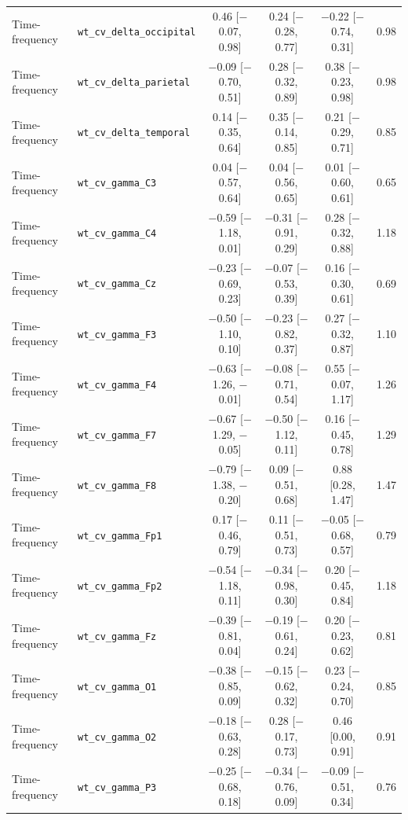 {\begin{longtable}{llcccc}
Time-frequency & \texttt{wt\_cv\_delta\_occipital} & 0.46 [$-$0.07, 0.98] & 0.24 [$-$0.28, 0.77] & $-$0.22 [$-$0.74, 0.31] & 0.98 \\
Time-frequency & \texttt{wt\_cv\_delta\_parietal} & $-$0.09 [$-$0.70, 0.51] & 0.28 [$-$0.32, 0.89] & 0.38 [$-$0.23, 0.98] & 0.98 \\
Time-frequency & \texttt{wt\_cv\_delta\_temporal} & 0.14 [$-$0.35, 0.64] & 0.35 [$-$0.14, 0.85] & 0.21 [$-$0.29, 0.71] & 0.85 \\
Time-frequency & \texttt{wt\_cv\_gamma\_C3} & 0.04 [$-$0.57, 0.64] & 0.04 [$-$0.56, 0.65] & 0.01 [$-$0.60, 0.61] & 0.65 \\
Time-frequency & \texttt{wt\_cv\_gamma\_C4} & $-$0.59 [$-$1.18, 0.01] & $-$0.31 [$-$0.91, 0.29] & 0.28 [$-$0.32, 0.88] & 1.18 \\
Time-frequency & \texttt{wt\_cv\_gamma\_Cz} & $-$0.23 [$-$0.69, 0.23] & $-$0.07 [$-$0.53, 0.39] & 0.16 [$-$0.30, 0.61] & 0.69 \\
Time-frequency & \texttt{wt\_cv\_gamma\_F3} & $-$0.50 [$-$1.10, 0.10] & $-$0.23 [$-$0.82, 0.37] & 0.27 [$-$0.32, 0.87] & 1.10 \\
Time-frequency & \texttt{wt\_cv\_gamma\_F4} & $-$0.63 [$-$1.26, $-$0.01] & $-$0.08 [$-$0.71, 0.54] & 0.55 [$-$0.07, 1.17] & 1.26 \\
Time-frequency & \texttt{wt\_cv\_gamma\_F7} & $-$0.67 [$-$1.29, $-$0.05] & $-$0.50 [$-$1.12, 0.11] & 0.16 [$-$0.45, 0.78] & 1.29 \\
Time-frequency & \texttt{wt\_cv\_gamma\_F8} & $-$0.79 [$-$1.38, $-$0.20] & 0.09 [$-$0.51, 0.68] & 0.88 [0.28, 1.47] & 1.47 \\
Time-frequency & \texttt{wt\_cv\_gamma\_Fp1} & 0.17 [$-$0.46, 0.79] & 0.11 [$-$0.51, 0.73] & $-$0.05 [$-$0.68, 0.57] & 0.79 \\
Time-frequency & \texttt{wt\_cv\_gamma\_Fp2} & $-$0.54 [$-$1.18, 0.11] & $-$0.34 [$-$0.98, 0.30] & 0.20 [$-$0.45, 0.84] & 1.18 \\
Time-frequency & \texttt{wt\_cv\_gamma\_Fz} & $-$0.39 [$-$0.81, 0.04] & $-$0.19 [$-$0.61, 0.24] & 0.20 [$-$0.23, 0.62] & 0.81 \\
Time-frequency & \texttt{wt\_cv\_gamma\_O1} & $-$0.38 [$-$0.85, 0.09] & $-$0.15 [$-$0.62, 0.32] & 0.23 [$-$0.24, 0.70] & 0.85 \\
Time-frequency & \texttt{wt\_cv\_gamma\_O2} & $-$0.18 [$-$0.63, 0.28] & 0.28 [$-$0.17, 0.73] & 0.46 [0.00, 0.91] & 0.91 \\
Time-frequency & \texttt{wt\_cv\_gamma\_P3} & $-$0.25 [$-$0.68, 0.18] & $-$0.34 [$-$0.76, 0.09] & $-$0.09 [$-$0.51, 0.34] & 0.76 \\

\end{longtable}}
